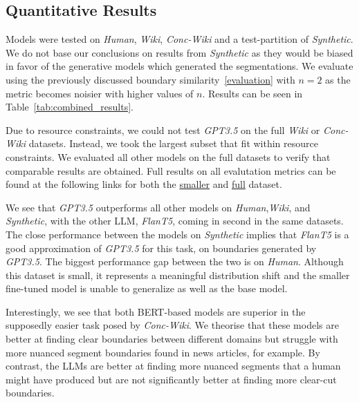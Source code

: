 
\subsection{Quantitative Results}

Models were tested on \emph{Human}, \emph{Wiki}, \emph{Conc-Wiki} and a test-partition of \emph{Synthetic}. We do not base our conclusions on results from \emph{Synthetic} as they would be biased in favor of the generative models which generated the segmentations. We evaluate using the previously discussed boundary similarity~\ref{evaluation} with $n=2$ as the metric becomes noisier with higher values of $n$. Results can be seen in Table~\ref{tab:combined_results}.

Due to resource constraints, we could not test \emph{GPT3.5} on the full \emph{Wiki} or \emph{Conc-Wiki} datasets. Instead, we took the largest subset that fit within resource constraints. We evaluated all other models on the full datasets to verify that comparable results are obtained. Full results on all evalutation metrics can be found at the following links for both the \href{https://docs.google.com/spreadsheets/d/e/2PACX-1vT3XnZ-npYMquwabYd_WGZrvFLtNDTsN-qwp94-kKR4M6Fq0Y0f87a6P0RNQ_W1VvGJtE_kPI5conlA/pubhtml}{smaller} and \href{https://docs.google.com/spreadsheets/d/e/2PACX-1vTPqglQkIVhni9NzkKeJUG_IYywFUFc1vNBK0j_TSDoK1S_WBkkgSlrRQ-xagjN44dVeAI8IU7krrLt/pubhtml}{full} dataset.

We see that \emph{GPT3.5} outperforms all other models on \emph{Human},\emph{Wiki}, and \emph{Synthetic}, with the other LLM, \emph{FlanT5}, coming in second in the same datasets. The close performance between the models on \emph{Synthetic} implies that \emph{FlanT5} is a good approximation of \emph{GPT3.5} for this task, on boundaries generated by \emph{GPT3.5}. The biggest performance gap between the two is on \emph{Human}. Although this dataset is small, it represents a meaningful distribution shift and the smaller fine-tuned model is unable to generalize as well as the base model.

Interestingly, we see that both BERT-based models are superior in the supposedly easier task posed by \emph{Conc-Wiki}. We theorise that these models are better at finding clear boundaries between different domains but struggle with more nuanced segment boundaries found in news articles, for example. By contrast, the LLMs are better at finding more nuanced segments that a human might have produced but are not significantly better at finding more clear-cut boundaries.

